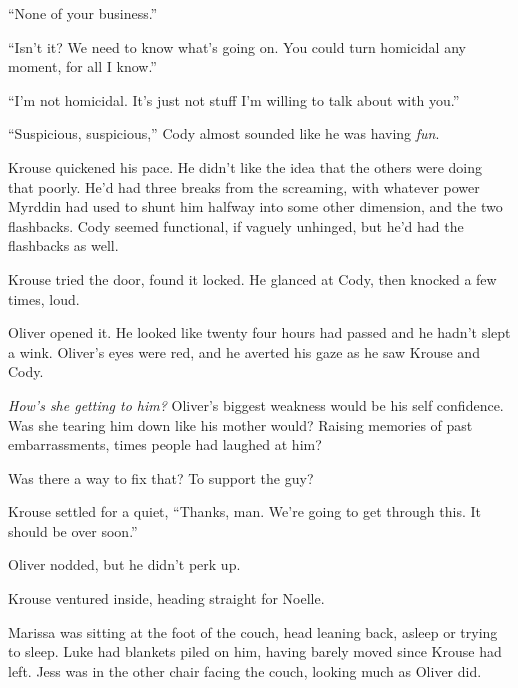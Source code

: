 ``None of your business.''



``Isn't it?  We need to know what's going on.  You could turn homicidal any moment, for all I know.''



``I'm not homicidal.  It's just not stuff I'm willing to talk about with you.''



``Suspicious, suspicious,'' Cody almost sounded like he was having \emph{fun}.



Krouse quickened his pace.  He didn't like the idea that the others were doing that poorly.  He'd had three breaks from the screaming, with whatever power Myrddin had used to shunt him halfway into some other dimension, and the two flashbacks.  Cody seemed functional, if vaguely unhinged, but he'd had the flashbacks as well.



Krouse tried the door, found it locked.  He glanced at Cody, then knocked a few times, loud.



Oliver opened it.  He looked like twenty four hours had passed and he hadn't slept a wink.  Oliver's eyes were red, and he averted his gaze as he saw Krouse and Cody.



\emph{How's she getting to him?  }Oliver's biggest weakness would be his self confidence.  Was she tearing him down like his mother would?  Raising memories of past embarrassments, times people had laughed at him?



Was there a way to fix that?  To support the guy?



Krouse settled for a quiet, ``Thanks, man.  We're going to get through this.  It should be over soon.''



Oliver nodded, but he didn't perk up.



Krouse ventured inside, heading straight for Noelle.



Marissa was sitting at the foot of the couch, head leaning back, asleep or trying to sleep.  Luke had blankets piled on him, having barely moved since Krouse had left.  Jess was in the other chair facing the couch, looking much as Oliver did.



